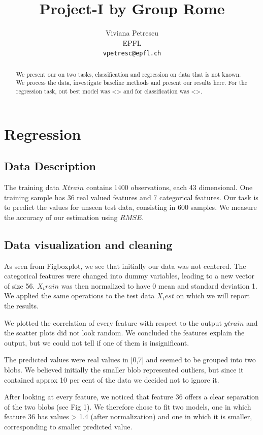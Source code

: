 \documentclass{article} %
\title{Project-I by Group Rome}
\author{
Viviana Petrescu\\
EPFL \\
\texttt{vpetresc@epfl.ch} \\
}
\begin{document}
\maketitle

\begin{abstract}
We present our on two tasks, classification and regression on data that is not known. We process the data, investigate baseline methods and present our results here.
For the regression task, out best model was <> and for classification was <>.
\end{abstract}

\section{Regression}
\subsection{Data Description}
The training data $Xtrain$ contains 1400 observations, each 43 dimensional. One training sample has 36 real valued features and 7 categorical features. Our task is to predict the values for unseen test data, consisting in 600 samples. We measure the accuracy of our estimation using $RMSE$. 

\subsection{Data visualization and cleaning}
As seen from Figboxplot, we see that initially our data was not centered.
The categorical features were changed into dummy variables, leading to a new vector of size 56. $X_train$ was then normalized to have 0 mean and standard deviation 1. We applied the same operations to the test data $X_test$ on which we will report the results.

 We plotted the correlation of every feature with respect to the output $ytrain$ and the scatter plots did not look random. We concluded the features explain the output, but we could not tell if one of them is insignificant.

The predicted values were real values in [0,7] and seemed to be grouped into two blobs. We believed initially the smaller blob represented outliers, but since it contained approx 10 per cent of the data we decided not to ignore it.

After looking at every feature, we noticed that feature 36 offers a clear separation of the two blobs (see Fig 1). We therefore chose to fit two models, one in which feature 36 has values > 1.4 (after normalization) and one in which it is smaller, corresponding to smaller predicted value. 
\end{document}
